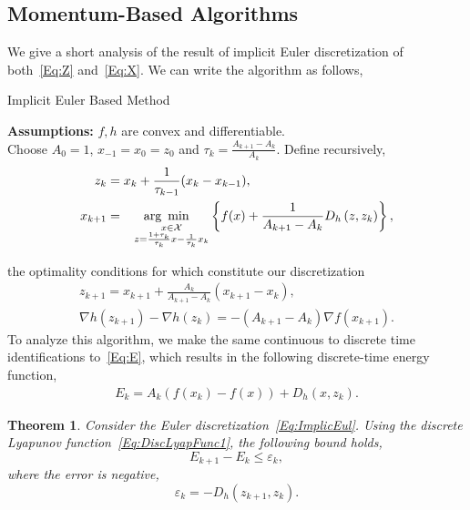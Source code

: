 \documentclass[11pt]{article}
\theoremstyle{plain}
\newtheorem{theorem}{Theorem}
\newcommand{\X}{{\mathcal X}}
\begin{document}
   \subsection{Momentum-Based Algorithms}
 We give a short analysis of the result of implicit Euler discretization of both~\eqref{Eq:Z} and~\eqref{Eq:X}. We can write the algorithm as follows,
\begin{algorithm}[H]
\caption{Implicit Euler Based Method}
{\bf Assumptions:} $f, h$ are convex and differentiable.\\
Choose $A_0 = 1$, $x_{-1}= x_0 = z_0$ and $\tau_{k} = \frac{A_{k+1} - A_k}{A_k}$. Define recursively,
\begin{subequations}\label{Eq:AlgoForward1}
\begin{align}
z_{k} &= x_{k} + \frac{1}{\tau_{k-1}} (x_{k} - x_{k-1}),\\%
x_{k+1} &= \underset{\substack{\,\,\,\,\,\,x\in\X\\ \,\,\,\,\,\,z =  \frac{1 + \tau_{k}}{\tau_{k}} x - \frac{1}{\tau_{k}} x_k}}{\text{arg\,\,\,min}} \left\{ f(x) + \frac{1}{A_{k+1} - A_k}D_h\left(z, z_k\right)\right\},
\end{align}
\end{subequations}
\end{algorithm}
\noindent the optimality conditions for which constitute our discretization
\begin{subequations}\label{Eq:ImplicEul}
\begin{align}
z_{k+1} = x_{k+1} + \frac{A_k}{A_{k+1} -A_{k}} (x_{k+1} - x_k),\label{Eq:ZSeq}\\
\nabla h(z_{k+1}) - \nabla h(z_k) = -(A_{k+1} - A_{k})\nabla f(x_{k+1})\label{Eq:XSeq}.
\end{align}
\end{subequations}
\noindent To analyze this algorithm, we make the same continuous to discrete time identifications to~\eqref{Eq:E}, which results in the following 
discrete-time energy function,
\begin{align}\label{Eq:DiscLyapFunc1}
 E_k = A_k(f(x_k) - f(x)) + D_h(x, z_{k}). 
 \end{align}
\begin{theorem}
Consider the 
 Euler discretization~\eqref{Eq:ImplicEul}. Using the discrete Lyapunov function~\eqref{Eq:DiscLyapFunc1}, the following bound holds,
\begin{equation*}
E_{k+1} - E_k \leq \varepsilon_k,
\end{equation*}
where the error is negative,
\begin{equation*}
\varepsilon_k = -D_h(z_{k+1}, z_k).
\end{equation*}
\end{theorem}
\end{document}
